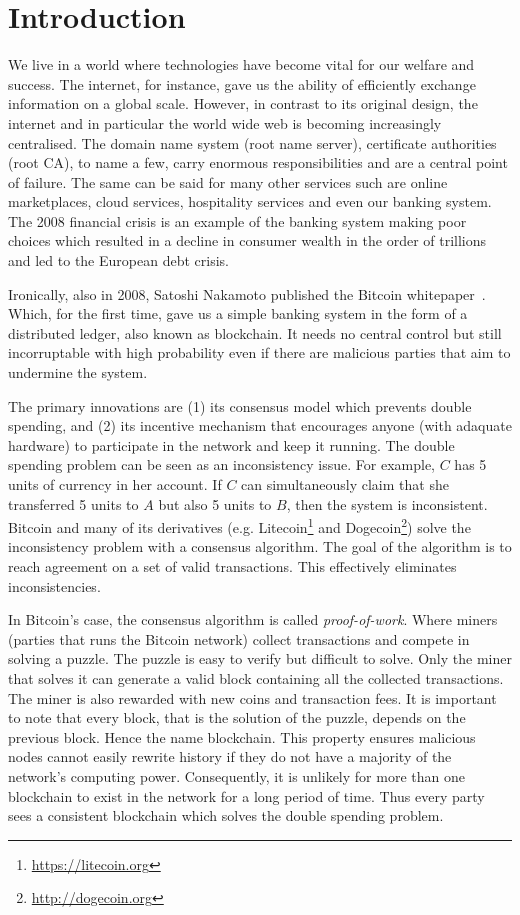 \chapter{Introduction}
\label{ch:intro}

We live in a world where technologies have become vital for our welfare and success.
The internet, for instance, gave us the ability of efficiently exchange information on a global scale.
However, in contrast to its original design, the internet and in particular the world wide web is becoming increasingly centralised.
The domain name system (root name server), certificate authorities (root CA), to name a few, carry enormous responsibilities and are a central point of failure.
The  same can be said for many other services such are online marketplaces,
cloud services, hospitality services and even our banking system.
The 2008 financial crisis is an example of the banking system making poor choices which resulted in a
decline in consumer wealth in the order of trillions~\cite{financialcrisis} and led to the European debt crisis.

Ironically, also in 2008, Satoshi Nakamoto published the Bitcoin whitepaper~\cite{bitcoin}.
Which, for the first time, gave us a simple banking system in the form of a distributed ledger, also known as blockchain.
It needs no central control but still incorruptable with high probability even if there are malicious parties that aim to undermine the system.

The primary innovations are (1) its consensus model which prevents double spending,
and (2) its incentive mechanism that encourages anyone (with adaquate hardware) to participate in the network and keep it running.
The double spending problem can be seen as an inconsistency issue.
For example, $C$ has 5 units of currency in her account.
If $C$ can simultaneously claim that she transferred 5 units to $A$ but also 5 units to $B$, then the system is inconsistent.
Bitcoin and many of its derivatives (e.g. Litecoin\footnote{\url{https://litecoin.org}} and Dogecoin\footnote{\url{http://dogecoin.org}}) solve the inconsistency problem with a consensus algorithm.
The goal of the algorithm is to reach agreement on a set of valid transactions. 
This effectively eliminates inconsistencies.

In Bitcoin's case, the consensus algorithm is called \emph{proof-of-work}.
Where miners (parties that runs the Bitcoin network) collect transactions and compete in solving a puzzle.
The puzzle is easy to verify but difficult to solve.
Only the miner that solves it can generate a valid block containing all the collected transactions.
The miner is also rewarded with new coins and transaction fees.
It is important to note that every block, that is the solution of the puzzle,
depends on the previous block.
Hence the name blockchain.
This property ensures malicious nodes cannot easily rewrite history if they do not have a majority of the network's computing power.
Consequently, it is unlikely for more than one blockchain to exist in the network for a long period of time.
Thus every party sees a consistent blockchain which solves the double spending problem.

